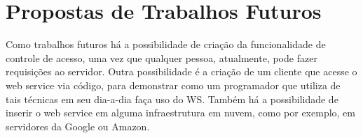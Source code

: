 \documentclass[12pt]{article}
\begin{document}
\section{Propostas de Trabalhos Futuros}

Como trabalhos futuros há a possibilidade de criação da funcionalidade de controle de acesso, uma vez que qualquer pessoa, atualmente, pode fazer requisições ao servidor. Outra possibilidade é a criação de um cliente que acesse o web service via código, para demonstrar como um programador que utiliza de tais técnicas em seu dia-a-dia faça uso do WS. Também há a possibilidade de inserir o web service em alguma infraestrutura em nuvem, como por exemplo, em servidores da Google ou Amazon.




\end{document}
